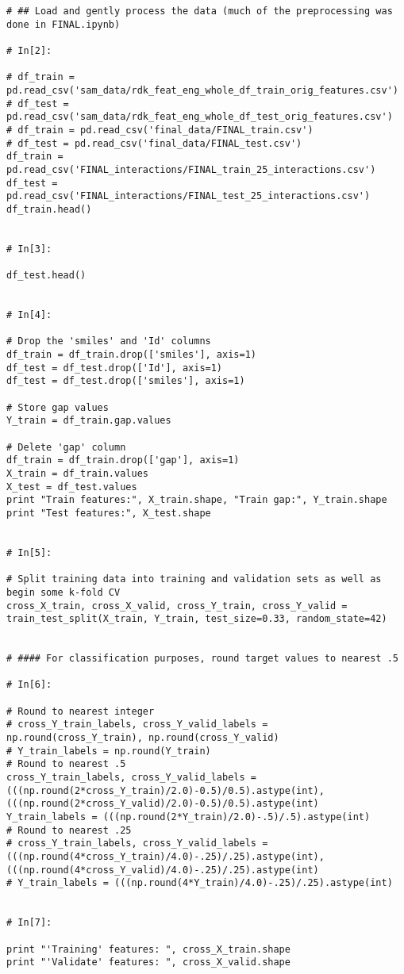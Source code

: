 \documentclass[11pt, oneside]{article}   	%
\begin{document}
\begin{lstlisting}
# ## Load and gently process the data (much of the preprocessing was done in FINAL.ipynb)

# In[2]:

# df_train = pd.read_csv('sam_data/rdk_feat_eng_whole_df_train_orig_features.csv')
# df_test = pd.read_csv('sam_data/rdk_feat_eng_whole_df_test_orig_features.csv')
# df_train = pd.read_csv('final_data/FINAL_train.csv')
# df_test = pd.read_csv('final_data/FINAL_test.csv')
df_train = pd.read_csv('FINAL_interactions/FINAL_train_25_interactions.csv')
df_test = pd.read_csv('FINAL_interactions/FINAL_test_25_interactions.csv')
df_train.head()


# In[3]:

df_test.head()


# In[4]:

# Drop the 'smiles' and 'Id' columns
df_train = df_train.drop(['smiles'], axis=1)
df_test = df_test.drop(['Id'], axis=1)
df_test = df_test.drop(['smiles'], axis=1)

# Store gap values
Y_train = df_train.gap.values

# Delete 'gap' column
df_train = df_train.drop(['gap'], axis=1)
X_train = df_train.values
X_test = df_test.values
print "Train features:", X_train.shape, "Train gap:", Y_train.shape
print "Test features:", X_test.shape


# In[5]:

# Split training data into training and validation sets as well as begin some k-fold CV
cross_X_train, cross_X_valid, cross_Y_train, cross_Y_valid = train_test_split(X_train, Y_train, test_size=0.33, random_state=42)


# #### For classification purposes, round target values to nearest .5

# In[6]:

# Round to nearest integer
# cross_Y_train_labels, cross_Y_valid_labels = np.round(cross_Y_train), np.round(cross_Y_valid)
# Y_train_labels = np.round(Y_train)
# Round to nearest .5
cross_Y_train_labels, cross_Y_valid_labels = (((np.round(2*cross_Y_train)/2.0)-0.5)/0.5).astype(int), (((np.round(2*cross_Y_valid)/2.0)-0.5)/0.5).astype(int)
Y_train_labels = (((np.round(2*Y_train)/2.0)-.5)/.5).astype(int)
# Round to nearest .25
# cross_Y_train_labels, cross_Y_valid_labels = (((np.round(4*cross_Y_train)/4.0)-.25)/.25).astype(int), (((np.round(4*cross_Y_valid)/4.0)-.25)/.25).astype(int)
# Y_train_labels = (((np.round(4*Y_train)/4.0)-.25)/.25).astype(int)


# In[7]:

print "'Training' features: ", cross_X_train.shape
print "'Validate' features: ", cross_X_valid.shape



\end{lstlisting}
\end{document}
